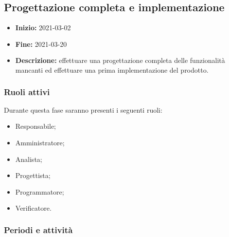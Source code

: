 

\subsection{Progettazione completa e implementazione} \label{_pianificazioneProgettazioneCompletaImplementazione}
\begin{itemize}
    \item []\textbf{Inizio:} 2021-03-02
    \item []\textbf{Fine:} 2021-03-20
    \item []\textbf{Descrizione:} effettuare una progettazione completa delle funzionalità mancanti ed effettuare una prima implementazione del prodotto.
\end{itemize}

\subsubsection{Ruoli attivi}
Durante questa fase saranno presenti i seguenti ruoli:
\begin{itemize}
    \item Responsabile;
    \item Amministratore;
    \item Analista;
    \item Progettista;
    \item Programmatore;
    \item Verificatore.
\end{itemize}

\subsubsection{Periodi e attività}

